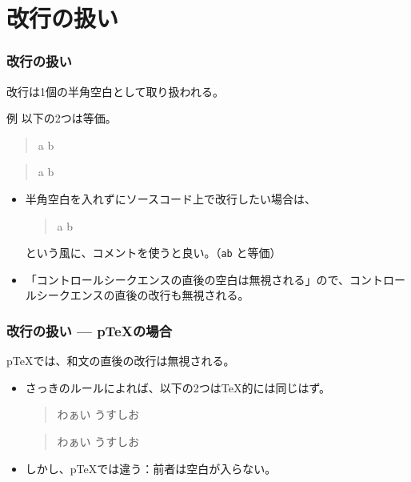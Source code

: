\documentclass{beamer}
\begin{document}

\section{改行の扱い}
\begin{frame}[fragile]\frametitle{改行の扱い}
改行は1個の半角空白として取り扱われる。
\begin{block}{例}
  以下の2つは等価。
  \begin{quote}
\begin{MyCode}
a
b
\end{MyCode}
\end{quote}
\begin{quote}
\begin{MyCode}
a b
\end{MyCode}
\end{quote}
\end{block}
  \begin{itemize}
\item 半角空白を入れずにソースコード上で改行したい場合は、
  \begin{quote}
\begin{MyCode}
a%
b
\end{MyCode}
\end{quote}
という風に、コメントを使うと良い。（\texttt{ab} と等価）
\item 「コントロールシークエンスの直後の空白は無視される」ので、コントロールシークエンスの直後の\alert{改行}も無視される。
  \end{itemize}
\end{frame}

\begin{frame}[fragile]\frametitle{改行の扱い --- p\TeX の場合}
p\TeX では、和文の直後の改行は無視される。
  \begin{itemize}
  \item さっきのルールによれば、以下の2つは\alert{\TeX 的には}同じはず。
    \begin{quote}
\begin{MyCode}
わぁい
うすしお
\end{MyCode}
\end{quote}
    \begin{quote}
\begin{MyCode}
わぁい うすしお
\end{MyCode}
\end{quote}
  \item しかし、\alert{p\TeX では}違う：前者は空白が入らない。
  \end{itemize}
\end{frame}
\end{document}
